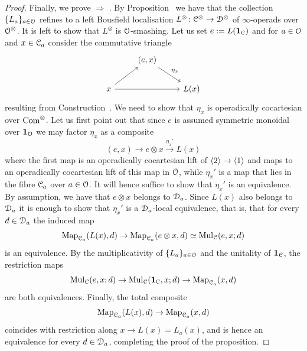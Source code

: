 \begin{proof}
Finally, we prove  $\Rightarrow$ . By Proposition~ we have that the collection $\{L_a\}_{a \in \mathcal{O}}$ refines to a left Bousfield localisation $L^{\otimes}\colon \mathcal C^{\otimes} \to \mathcal{D}^{\otimes}$ of $\infty$-operads over $\mathcal{O}^{\otimes}$. It is left to show that $L^{\otimes}$ is $\mathcal{O}$-smashing. %
Let us set $e := L(\mathbf{1}_{\mathcal C})$ and for $a \in \mathcal{O}$ and $x \in \mathcal C_a$ consider the commutative triangle
\[
\begin{tikzcd}
& (e,x) \ar[dr,"\eta_x"] & \\
x \ar[rr]\ar[ur] && L(x) 
\end{tikzcd}
\]
resulting from Construction~. We need to show that $\eta_x$ is operadically cocartesian over $\mathrm{Com}^{\otimes}$. Let us first point out that since $e$ is assumed symmetric monoidal over $\mathbf{1}_{\mathcal{O}}$
we may factor $\eta_x$ as a composite 
\[
(e,x) \to e \otimes x \xrightarrow{\eta_x'} L(x)
\]
where the first map is an operadically cocartesian lift of $\langle2\rangle \to \langle1\rangle$ and maps to an operadically cocartesian 
lift of this map in $\mathcal{O}$, while $\eta_x'$ is a map that lies in the fibre $\mathcal C_a$ over $a \in \mathcal{O}$. It will hence suffice to show that $\eta_x'$ is an equivalence. 
By assumption, we have that $e \otimes x$ belongs to $\mathcal{D}_a$. Since $L(x)$ also belongs to $\mathcal{D}_a$ %
it is enough to show that $\eta_x'$ is a $\mathcal{D}_a$-local equivalence, that is, that for every $d \in \mathcal{D}_a$ the induced map 
\[
\operatorname{Map}_{\mathcal C_a}(L(x),d) \to \operatorname{Map}_{\mathcal C_a}(e \otimes x,d) \simeq \mathrm{Mul}_{\mathcal C}(e,x; d)
\]
is an equivalence. By the multiplicativity of $\{L_a\}_{a \in \mathcal{O}}$ and the unitality of $\mathbf{1}_{\mathcal C}$, the restriction maps
\[
\mathrm{Mul}_{\mathcal C}(e,x; d) \to \mathrm{Mul}_{\mathcal C}(\mathbf{1}_{\mathcal C},x; d) \to \operatorname{Map}_{\mathcal C_a}(x,d)
\]
are both equivalences. Finally, the total composite 
\[
\operatorname{Map}_{\mathcal C_a}(L(x),d) \to \operatorname{Map}_{\mathcal C_a}(x,d)
\]
coincides with restriction along $x \to L(x) = L_a(x)$, and is hence an equivalence for every $d \in \mathcal{D}_a$, completing the proof of the proposition.
\end{proof}





